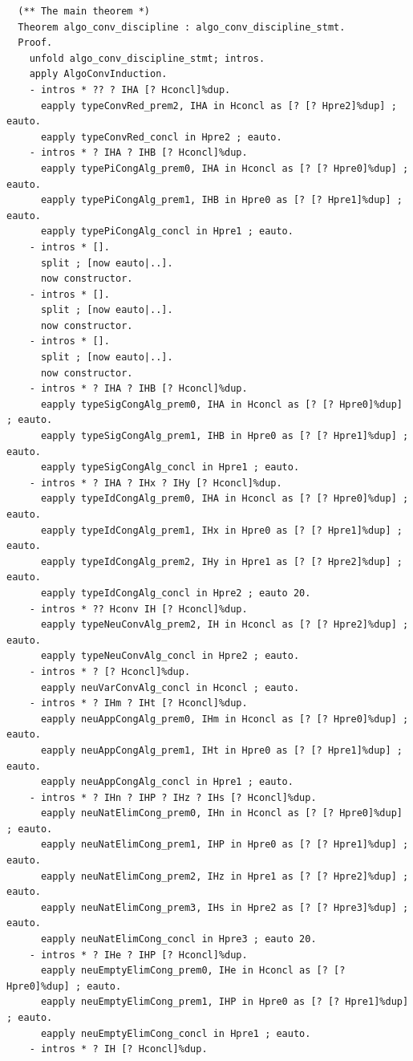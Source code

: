 \begin{lstlisting}
  (** The main theorem *)
  Theorem algo_conv_discipline : algo_conv_discipline_stmt.
  Proof.
    unfold algo_conv_discipline_stmt; intros.
    apply AlgoConvInduction.
    - intros * ?? ? IHA [? Hconcl]%dup.
      eapply typeConvRed_prem2, IHA in Hconcl as [? [? Hpre2]%dup] ; eauto.
      eapply typeConvRed_concl in Hpre2 ; eauto.
    - intros * ? IHA ? IHB [? Hconcl]%dup.
      eapply typePiCongAlg_prem0, IHA in Hconcl as [? [? Hpre0]%dup] ; eauto.
      eapply typePiCongAlg_prem1, IHB in Hpre0 as [? [? Hpre1]%dup] ; eauto.
      eapply typePiCongAlg_concl in Hpre1 ; eauto.
    - intros * [].
      split ; [now eauto|..].
      now constructor.
    - intros * [].
      split ; [now eauto|..].
      now constructor.
    - intros * [].
      split ; [now eauto|..].
      now constructor.
    - intros * ? IHA ? IHB [? Hconcl]%dup.
      eapply typeSigCongAlg_prem0, IHA in Hconcl as [? [? Hpre0]%dup] ; eauto.
      eapply typeSigCongAlg_prem1, IHB in Hpre0 as [? [? Hpre1]%dup] ; eauto.
      eapply typeSigCongAlg_concl in Hpre1 ; eauto.
    - intros * ? IHA ? IHx ? IHy [? Hconcl]%dup.
      eapply typeIdCongAlg_prem0, IHA in Hconcl as [? [? Hpre0]%dup] ; eauto.
      eapply typeIdCongAlg_prem1, IHx in Hpre0 as [? [? Hpre1]%dup] ; eauto.
      eapply typeIdCongAlg_prem2, IHy in Hpre1 as [? [? Hpre2]%dup] ; eauto.
      eapply typeIdCongAlg_concl in Hpre2 ; eauto 20.
    - intros * ?? Hconv IH [? Hconcl]%dup.
      eapply typeNeuConvAlg_prem2, IH in Hconcl as [? [? Hpre2]%dup] ; eauto.
      eapply typeNeuConvAlg_concl in Hpre2 ; eauto.
    - intros * ? [? Hconcl]%dup.
      eapply neuVarConvAlg_concl in Hconcl ; eauto.
    - intros * ? IHm ? IHt [? Hconcl]%dup.
      eapply neuAppCongAlg_prem0, IHm in Hconcl as [? [? Hpre0]%dup] ; eauto.
      eapply neuAppCongAlg_prem1, IHt in Hpre0 as [? [? Hpre1]%dup] ; eauto.
      eapply neuAppCongAlg_concl in Hpre1 ; eauto.
    - intros * ? IHn ? IHP ? IHz ? IHs [? Hconcl]%dup.
      eapply neuNatElimCong_prem0, IHn in Hconcl as [? [? Hpre0]%dup] ; eauto.
      eapply neuNatElimCong_prem1, IHP in Hpre0 as [? [? Hpre1]%dup] ; eauto.
      eapply neuNatElimCong_prem2, IHz in Hpre1 as [? [? Hpre2]%dup] ; eauto.
      eapply neuNatElimCong_prem3, IHs in Hpre2 as [? [? Hpre3]%dup] ; eauto.
      eapply neuNatElimCong_concl in Hpre3 ; eauto 20.
    - intros * ? IHe ? IHP [? Hconcl]%dup.
      eapply neuEmptyElimCong_prem0, IHe in Hconcl as [? [? Hpre0]%dup] ; eauto.
      eapply neuEmptyElimCong_prem1, IHP in Hpre0 as [? [? Hpre1]%dup] ; eauto.
      eapply neuEmptyElimCong_concl in Hpre1 ; eauto.
    - intros * ? IH [? Hconcl]%dup.

\end{lstlisting}
